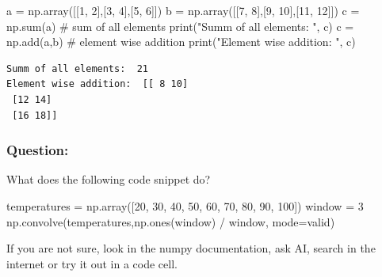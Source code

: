\documentclass[
  letterpaper,
  DIV=11,
  numbers=noendperiod]{scrreprt}
\newenvironment{Shaded}{\begin{snugshade}}{\end{snugshade}}
\newcommand{\BuiltInTok}[1]{\textcolor[rgb]{0.00,0.23,0.31}{#1}}
\newcommand{\CommentTok}[1]{\textcolor[rgb]{0.37,0.37,0.37}{#1}}
\newcommand{\DecValTok}[1]{\textcolor[rgb]{0.68,0.00,0.00}{#1}}
\newcommand{\NormalTok}[1]{\textcolor[rgb]{0.00,0.23,0.31}{#1}}
\newcommand{\OperatorTok}[1]{\textcolor[rgb]{0.37,0.37,0.37}{#1}}
\newcommand{\StringTok}[1]{\textcolor[rgb]{0.13,0.47,0.30}{#1}}
\begin{document}
\begin{Shaded}
\begin{Highlighting}[]
\NormalTok{a }\OperatorTok{=}\NormalTok{ np.array([[}\DecValTok{1}\NormalTok{, }\DecValTok{2}\NormalTok{],[}\DecValTok{3}\NormalTok{, }\DecValTok{4}\NormalTok{],[}\DecValTok{5}\NormalTok{, }\DecValTok{6}\NormalTok{]])}
\NormalTok{b }\OperatorTok{=}\NormalTok{ np.array([[}\DecValTok{7}\NormalTok{, }\DecValTok{8}\NormalTok{],[}\DecValTok{9}\NormalTok{, }\DecValTok{10}\NormalTok{],[}\DecValTok{11}\NormalTok{, }\DecValTok{12}\NormalTok{]])}
\NormalTok{c }\OperatorTok{=}\NormalTok{ np.}\BuiltInTok{sum}\NormalTok{(a) }\CommentTok{\# sum of all elements}
\BuiltInTok{print}\NormalTok{(}\StringTok{"Summ of all elements: "}\NormalTok{, c)}
\NormalTok{c }\OperatorTok{=}\NormalTok{ np.add(a,b) }\CommentTok{\# element wise addition}
\BuiltInTok{print}\NormalTok{(}\StringTok{"Element wise addition: "}\NormalTok{, c)}
\end{Highlighting}
\end{Shaded}

\begin{verbatim}
Summ of all elements:  21
Element wise addition:  [[ 8 10]
 [12 14]
 [16 18]]
\end{verbatim}

\subsubsection{Question:}\label{question}

What does the following code snippet do?

\begin{Shaded}
\begin{Highlighting}[]
\NormalTok{temperatures }\OperatorTok{=}\NormalTok{ np.array([}\DecValTok{20}\NormalTok{, }\DecValTok{30}\NormalTok{, }\DecValTok{40}\NormalTok{, }\DecValTok{50}\NormalTok{, }\DecValTok{60}\NormalTok{, }\DecValTok{70}\NormalTok{, }\DecValTok{80}\NormalTok{, }\DecValTok{90}\NormalTok{, }\DecValTok{100}\NormalTok{])}
\NormalTok{window }\OperatorTok{=} \DecValTok{3}
\NormalTok{np.convolve(temperatures,np.ones(window) }\OperatorTok{/}\NormalTok{ window,}
\NormalTok{                            mode}\OperatorTok{=}\StringTok{\textquotesingle{}valid\textquotesingle{}}\NormalTok{)}
\end{Highlighting}
\end{Shaded}

If you are not sure, look in the numpy documentation, ask AI, search in
the internet or try it out in a code cell.
\end{document}

